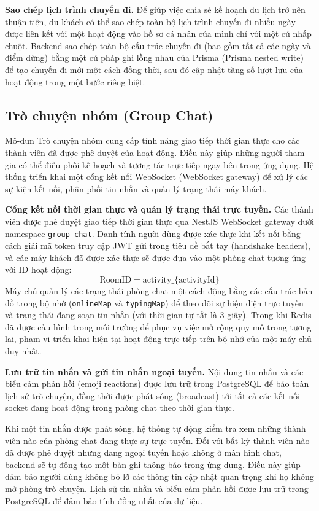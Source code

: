 \documentclass[a4paper,12pt]{report}
\begin{document}
\textbf{Sao chép lịch trình chuyến đi.}
Để giúp việc chia sẻ kế hoạch du lịch trở nên thuận tiện, du khách có thể sao chép toàn bộ lịch trình chuyến đi nhiều ngày được liên kết với một hoạt động vào hồ sơ cá nhân của mình chỉ với một cú nhấp chuột. Backend sao chép toàn bộ cấu trúc chuyến đi (bao gồm tất cả các ngày và điểm dừng) bằng một cú pháp ghi lồng nhau của Prisma (Prisma nested write) để tạo chuyến đi mới một cách đồng thời, sau đó cập nhật tăng số lượt lưu của hoạt động trong một bước riêng biệt.

\subsection{Trò chuyện nhóm (Group Chat)}

Mô-đun Trò chuyện nhóm cung cấp tính năng giao tiếp thời gian thực cho các thành viên đã được phê duyệt của hoạt động. Điều này giúp những người tham gia có thể điều phối kế hoạch và tương tác trực tiếp ngay bên trong ứng dụng. Hệ thống triển khai một cổng kết nối WebSocket (WebSocket gateway) để xử lý các sự kiện kết nối, phân phối tin nhắn và quản lý trạng thái máy khách.

\textbf{Cổng kết nối thời gian thực và quản lý trạng thái trực tuyến.}
Các thành viên được phê duyệt giao tiếp thời gian thực qua NestJS WebSocket gateway dưới namespace \texttt{group-chat}. Danh tính người dùng được xác thực khi kết nối bằng cách giải mã token truy cập JWT gửi trong tiêu đề bắt tay (handshake headers), và các máy khách đã được xác thực sẽ được đưa vào một phòng chat tương ứng với ID hoạt động:
\[
\text{RoomID} = \text{activity\_}\{\text{activityId}\}
\]
Máy chủ quản lý các trạng thái phòng chat một cách động bằng các cấu trúc bản đồ trong bộ nhớ (\texttt{onlineMap} và \texttt{typingMap}) để theo dõi sự hiện diện trực tuyến và trạng thái đang soạn tin nhắn (với thời gian tự tắt là 3 giây). Trong khi Redis đã được cấu hình trong môi trường để phục vụ việc mở rộng quy mô trong tương lai, phạm vi triển khai hiện tại hoạt động trực tiếp trên bộ nhớ của một máy chủ duy nhất.

\textbf{Lưu trữ tin nhắn và gửi tin nhắn ngoại tuyến.}
Nội dung tin nhắn và các biểu cảm phản hồi (emoji reactions) được lưu trữ trong PostgreSQL để bảo toàn lịch sử trò chuyện, đồng thời được phát sóng (broadcast) tới tất cả các kết nối socket đang hoạt động trong phòng chat theo thời gian thực.

Khi một tin nhắn được phát sóng, hệ thống tự động kiểm tra xem những thành viên nào của phòng chat đang thực sự trực tuyến. Đối với bất kỳ thành viên nào đã được phê duyệt nhưng đang ngoại tuyến hoặc không ở màn hình chat, backend sẽ tự động tạo một bản ghi thông báo trong ứng dụng. Điều này giúp đảm bảo người dùng không bỏ lỡ các thông tin cập nhật quan trọng khi họ không mở phòng trò chuyện. Lịch sử tin nhắn và biểu cảm phản hồi được lưu trữ trong PostgreSQL để đảm bảo tính đồng nhất của dữ liệu.
\end{document}
